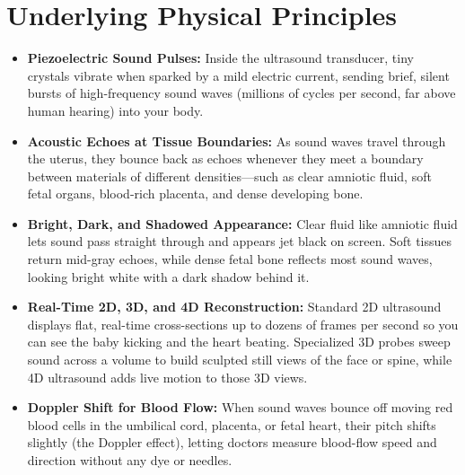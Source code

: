 \section{Underlying Physical Principles}
\begin{itemize}
\item \textbf{Piezoelectric Sound Pulses:} Inside the ultrasound transducer, tiny crystals vibrate when sparked by a mild electric current, sending brief, silent bursts of high-frequency sound waves (millions of cycles per second, far above human hearing) into your body.
\item \textbf{Acoustic Echoes at Tissue Boundaries:} As sound waves travel through the uterus, they bounce back as echoes whenever they meet a boundary between materials of different densities---such as clear amniotic fluid, soft fetal organs, blood-rich placenta, and dense developing bone.
\item \textbf{Bright, Dark, and Shadowed Appearance:} Clear fluid like amniotic fluid lets sound pass straight through and appears jet black on screen. Soft tissues return mid-gray echoes, while dense fetal bone reflects most sound waves, looking bright white with a dark shadow behind it.
\item \textbf{Real-Time 2D, 3D, and 4D Reconstruction:} Standard 2D ultrasound displays flat, real-time cross-sections up to dozens of frames per second so you can see the baby kicking and the heart beating. Specialized 3D probes sweep sound across a volume to build sculpted still views of the face or spine, while 4D ultrasound adds live motion to those 3D views.
\item \textbf{Doppler Shift for Blood Flow:} When sound waves bounce off moving red blood cells in the umbilical cord, placenta, or fetal heart, their pitch shifts slightly (the Doppler effect), letting doctors measure blood-flow speed and direction without any dye or needles.
\end{itemize}

